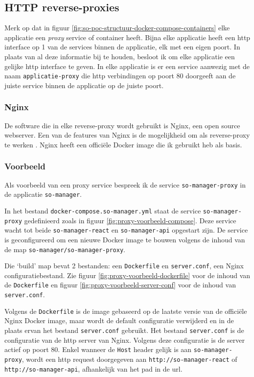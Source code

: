 \documentclass[a4paper,12pt]{report}
\begin{document}
\subsection{HTTP reverse-proxies}
Merk op dat in figuur \ref{fig:so-poc-structuur-docker-compose-containers} elke applicatie een \emph{proxy} service of container heeft.
Bijna elke applicatie heeft een http interface op 1 van de services binnen de applicatie, elk met een eigen poort.
In plaats van al deze informatie bij te houden, besloot ik om elke applicatie een gelijke http interface te geven.
In elke applicatie is er een service aanwezig met de naam \lstinline|applicatie-proxy| die http verbindingen op poort 80 doorgeeft aan de juiste service binnen de applicatie op de juiste poort.

\subsubsection{Nginx}
De software die in elke reverse-proxy wordt gebruikt is Nginx, een open source webserver.
Een van de features van Nginx is de mogelijkheid om als reverse-proxy te werken \autocite{nginx:about}.
Nginx heeft een officiële Docker image die ik gebruikt heb als basis.

\subsubsection{Voorbeeld}
Als voorbeeld van een proxy service bespreek ik de service \lstinline|so-manager-proxy| in de applicatie \lstinline|so-manager|.

In het bestand \lstinline|docker-compose.so-manager.yml| staat de service \lstinline|so-manager-proxy| gedefinieerd zoals in figuur \ref{fig:proxy-voorbeeld-compose}.
Deze service wacht tot beide \lstinline|so-manager-react| en \lstinline|so-manager-api| opgestart zijn.
De service is geconfigureerd om een nieuwe Docker image te bouwen volgens de inhoud van de map \lstinline|so-manager/so-manager-proxy|.

Die `build' map bevat 2 bestanden: een \lstinline|Dockerfile| en \lstinline|server.conf|, een Nginx configuratiebestand.
Zie figuur \ref{fig:proxy-voorbeeld-dockerfile} voor de inhoud van de \lstinline|Dockerfile| en figuur \ref{fig:proxy-voorbeeld-server-conf} voor de inhoud van \lstinline|server.conf|.

Volgens de \lstinline|Dockerfile| is de image gebaseerd op de laatste versie van de officiële Nginx Docker image, maar wordt de default configuratie verwijderd en in de plaats ervan het bestand \lstinline|server.conf| gebruikt.
Het bestand \lstinline|server.conf| is de configuratie van de http server van Nginx.
Volgens deze configuratie is de server actief op poort 80.
Enkel wanneer de \lstinline|Host| header gelijk is aan \lstinline|so-manager-proxy|, wordt een http request doorgegeven aan \lstinline|http://so-manager-react| of \lstinline|http://so-manager-api|, afhankelijk van het pad in de url.
\end{document}

